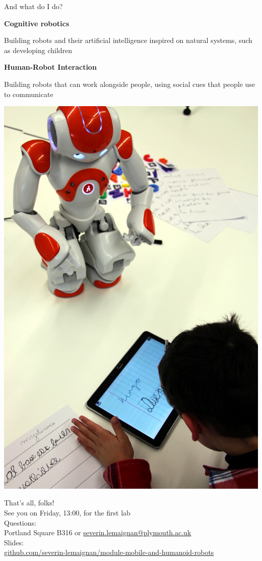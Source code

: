 \documentclass[compress]{beamer}
\begin{document}
\begin{frame}{And what do I do?}

\begin{multicols}{2}

    \textbf{Cognitive robotics}

  Building robots and their artificial intelligence inspired on natural
  systems, such as developing children

    \textbf{Human-Robot Interaction}

  Building robots that can work alongside people, using social cues that
  people use to communicate

    \begin{center}
        \includegraphics[width=0.8\linewidth]{cowriter}
    \end{center}

\end{multicols}
\end{frame}


\begin{frame}{}
    \begin{center}
        \Large
        That's all, folks!\\[2em]
        \normalsize
        See you on Friday, 13:00, for the first lab\\[1em]
        Questions:\\
        Portland Square B316 or \url{severin.lemaignan@plymouth.ac.uk} \\[1em]

        Slides:\\ \href{https://github.com/severin-lemaignan/module-mobile-and-humanoid-robots}{\small github.com/severin-lemaignan/module-mobile-and-humanoid-robots}

    \end{center}
\end{frame}
\end{document}
